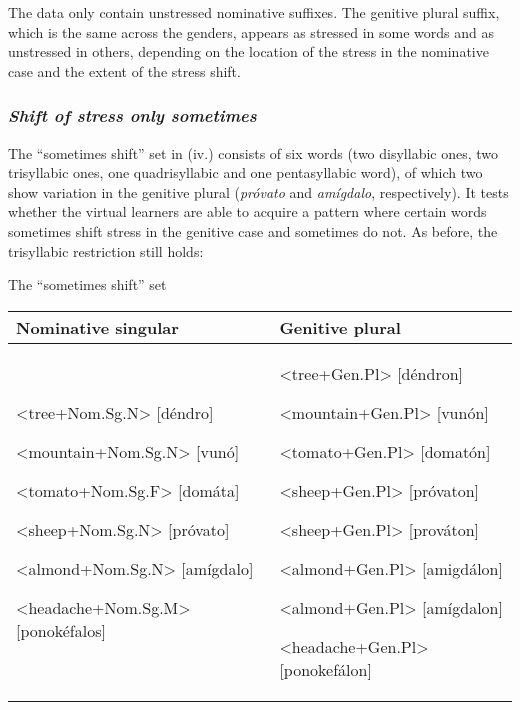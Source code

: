 \documentclass[a4paper]{article}
\begin{document}
The data only contain unstressed nominative suffixes. The genitive plural suffix, which is the same across the genders, appears as stressed in some words and as unstressed in others, depending on the location of the stress in the nominative case and the extent of the stress shift.

\subsubsection{{\itshape
Shift of stress only sometimes}}


The “sometimes shift” set in (iv.) consists of six words (two disyllabic ones, two trisyllabic ones, one quadrisyllabic and one pentasyllabic word), of which two show variation in the genitive plural (\textit{próvato} and \textit{amígdalo}, respectively). It tests whether the virtual learners are able to acquire a pattern where certain words sometimes shift stress in the genitive case and sometimes do not. As before, the trisyllabic restriction still holds:


\ea The “sometimes shift” set

\begin{center}
\tablehead{}
\begin{supertabular}{m{2.68096in}|m{2.41706in}}
 Nominative singular &
 Genitive plural\\\hline
{ {\textless}tree+Nom.Sg.N{\textgreater} [déndro] \ \ }

{ {\textless}mountain+Nom.Sg.N{\textgreater} [vunó] }

{ {\textless}tomato+Nom.Sg.F{\textgreater} [domáta] }

{ {\textless}sheep+Nom.Sg.N{\textgreater} [próvato] }

{ {\textless}almond+Nom.Sg.N{\textgreater} [amígdalo] }

 {\textless}headache+Nom.Sg.M{\textgreater} [ponokéfalos]  &
{ {\textless}tree+Gen.Pl{\textgreater} [déndron] \ \ }

{ {\textless}mountain+Gen.Pl{\textgreater} [vunón] }

{ {\textless}tomato+Gen.Pl{\textgreater} [domatón] }

{ {\textless}sheep+Gen.Pl{\textgreater} [próvaton] }

{ {\textless}sheep+Gen.Pl{\textgreater} [prováton] }

{ {\textless}almond+Gen.Pl{\textgreater} [amigdálon] }

{ {\textless}almond+Gen.Pl{\textgreater} [amígdalon] }

 {\textless}headache+Gen.Pl{\textgreater} [ponokefálon] \\
\end{supertabular}
\end{center}
\z
\end{document}
